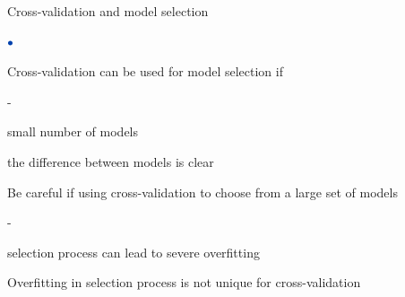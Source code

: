\documentclass[english,t]{beamer}
\newenvironment{list1}{
   \begin{list}{$\color{list1}\bullet$}{\itemsep=6pt}}{
  \end{list}}
\newenvironment{list2}{
  \begin{list}{-}{\baselineskip=12pt\itemsep=2pt}}{
  \end{list}}
\begin{document}
\begin{frame}{ Cross-validation and model selection}

  \begin{list1}
  \item<1-> Cross-validation can be used for model selection if
    \begin{list2}
      \item small number of models
      \item the difference between models is clear
    \end{list2}
  \item<2-> Be careful if using cross-validation to choose from a large set of models
    \begin{list2}
    \item selection process can lead to severe overfitting
    \end{list2}
  \item<3-> Overfitting in selection process is not unique for cross-validation
  \end{list1}
\end{frame}







\end{document}
